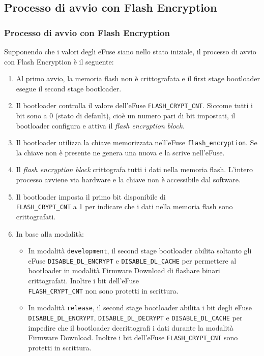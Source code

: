 \documentclass{beamer}
\begin{document}
\subsection{Processo di avvio con Flash Encryption}
\begin{frame}[allowframebreaks]
\frametitle{Processo di avvio con Flash Encryption}
Supponendo che i valori degli eFuse siano nello stato iniziale, il processo di avvio
con Flash Encryption è il seguente:
\begin{enumerate}
  \item Al primo avvio, la memoria flash non è crittografata e il first stage bootloader
    esegue il second stage bootloader.

  \item Il bootloader controlla il valore dell'eFuse
    \texttt{FLASH\_CRYPT\_CNT}. Siccome tutti i bit sono a 0 (stato di default),
    cioè un numero pari di bit impostati, il bootloader configura e attiva il
    \textit{flash encryption block}.

    \item Il bootloader utilizza la chiave memorizzata nell'eFuse
      \texttt{flash\_encryption}. Se la chiave non è presente ne genera una nuova e la
      scrive nell'eFuse.

  \item Il \textit{flash encryption block} crittografa tutti i dati nella memoria flash.
    L'intero processo avviene via hardware e la chiave non è accessibile
    dal software.

  \item Il bootloader imposta il primo bit disponibile di \\
    \texttt{FLASH\_CRYPT\_CNT} a 1 per indicare che i dati nella memoria flash sono
    crittografati. 

  \item In base alla modalità:
  \begin{itemize}
    \item In modalità \texttt{development}, il second stage bootloader abilita soltanto
      gli eFuse \texttt{DISABLE\_DL\_ENCRYPT} e \texttt{DISABLE\_DL\_CACHE} per
      permettere al bootloader in modalità Firmware Download di flashare binari crittografati.
      Inoltre i bit dell'eFuse \\ \texttt{FLASH\_CRYPT\_CNT} non sono protetti in scrittura.

    \item In modalità \texttt{release}, il second stage bootloader abilita i bit degli eFuse \\
      \texttt{DISABLE\_DL\_ENCRYPT}, \texttt{DISABLE\_DL\_DECRYPT} e \texttt{DISABLE\_DL\_CACHE}
      per impedire che il bootloader decrittografi i dati durante la modalità Firmware
      Download. Inoltre i bit dell'eFuse \texttt{FLASH\_CRYPT\_CNT} sono protetti in
      scrittura.
  \end{itemize}



\end{enumerate}
\end{frame}
\end{document}
